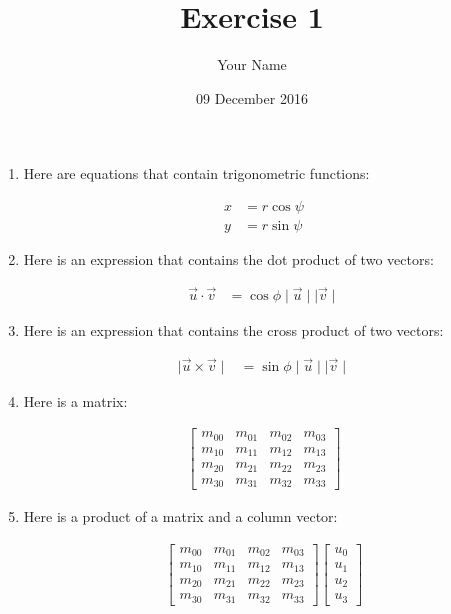 \documentclass[twoside]{article}
\title{Exercise 1}
\author{Your Name}
\date{09 December 2016}
\begin{document}
\maketitle

\begin{enumerate}
  \item Here are equations that contain trigonometric functions:

  \begin{align*}
    x & = r \cos \psi \\
    y & = r \sin \psi
    \end{align*}

  \item Here is an expression that contains the dot
    product of two vectors:

  \begin{align*}
    \vec{u} \cdot \vec{v} & = \cos \phi \mid \vec{u} \mid \mid \vec{v} \mid
    \end{align*}

  \item Here is an expression that contains the cross
    product of two vectors:

  \begin{align*}
    \mid \vec{u} \times \vec{v} \mid & =
        \sin \phi \mid \vec{u} \mid \mid \vec{v} \mid
    \end{align*}

  \item Here is a matrix:

  \begin{align*}
    \begin{bmatrix}
      m_{00} & m_{01} & m_{02} & m_{03} \\
      m_{10} & m_{11} & m_{12} & m_{13} \\
      m_{20} & m_{21} & m_{22} & m_{23} \\
      m_{30} & m_{31} & m_{32} & m_{33} 
      \end{bmatrix}
    \end{align*}

  \item Here is a product of a matrix and a column vector:

  \begin{align*}
    \begin{bmatrix}
      m_{00} & m_{01} & m_{02} & m_{03} \\
      m_{10} & m_{11} & m_{12} & m_{13} \\
      m_{20} & m_{21} & m_{22} & m_{23} \\
      m_{30} & m_{31} & m_{32} & m_{33} 
      \end{bmatrix}
    \begin{bmatrix}
      u_0 \\
      u_1 \\
      u_2 \\
      u_3
      \end{bmatrix}
    \end{align*}


\end{enumerate}
\end{document}
